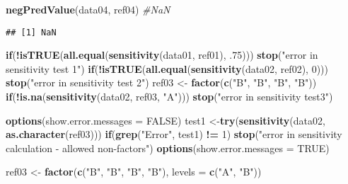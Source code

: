 \documentclass[]{article}
\newenvironment{Shaded}{\begin{snugshade}}{\end{snugshade}}
\newcommand{\CommentTok}[1]{\textcolor[rgb]{0.56,0.35,0.01}{\textit{#1}}}
\newcommand{\ControlFlowTok}[1]{\textcolor[rgb]{0.13,0.29,0.53}{\textbf{#1}}}
\newcommand{\DataTypeTok}[1]{\textcolor[rgb]{0.13,0.29,0.53}{#1}}
\newcommand{\DecValTok}[1]{\textcolor[rgb]{0.00,0.00,0.81}{#1}}
\newcommand{\FloatTok}[1]{\textcolor[rgb]{0.00,0.00,0.81}{#1}}
\newcommand{\KeywordTok}[1]{\textcolor[rgb]{0.13,0.29,0.53}{\textbf{#1}}}
\newcommand{\NormalTok}[1]{#1}
\newcommand{\OperatorTok}[1]{\textcolor[rgb]{0.81,0.36,0.00}{\textbf{#1}}}
\newcommand{\OtherTok}[1]{\textcolor[rgb]{0.56,0.35,0.01}{#1}}
\newcommand{\StringTok}[1]{\textcolor[rgb]{0.31,0.60,0.02}{#1}}
\begin{document}
\begin{Shaded}
\begin{Highlighting}[]
\KeywordTok{negPredValue}\NormalTok{(data04, ref04) }\CommentTok{#NaN}
\end{Highlighting}
\end{Shaded}

\begin{verbatim}
## [1] NaN
\end{verbatim}

\begin{Shaded}
\begin{Highlighting}[]
\ControlFlowTok{if}\NormalTok{(}\OperatorTok{!}\KeywordTok{isTRUE}\NormalTok{(}\KeywordTok{all.equal}\NormalTok{(}\KeywordTok{sensitivity}\NormalTok{(data01, ref01), }\FloatTok{.75}\NormalTok{))) }\KeywordTok{stop}\NormalTok{(}\StringTok{"error in sensitivity test 1"}\NormalTok{)}
\ControlFlowTok{if}\NormalTok{(}\OperatorTok{!}\KeywordTok{isTRUE}\NormalTok{(}\KeywordTok{all.equal}\NormalTok{(}\KeywordTok{sensitivity}\NormalTok{(data02, ref02), }\DecValTok{0}\NormalTok{))) }\KeywordTok{stop}\NormalTok{(}\StringTok{"error in sensitivity test 2"}\NormalTok{)}
\NormalTok{ref03 <-}\StringTok{ }\KeywordTok{factor}\NormalTok{(}\KeywordTok{c}\NormalTok{(}\StringTok{"B"}\NormalTok{, }\StringTok{"B"}\NormalTok{, }\StringTok{"B"}\NormalTok{, }\StringTok{"B"}\NormalTok{))}
\ControlFlowTok{if}\NormalTok{(}\OperatorTok{!}\KeywordTok{is.na}\NormalTok{(}\KeywordTok{sensitivity}\NormalTok{(data02, ref03, }\StringTok{"A"}\NormalTok{))) }\KeywordTok{stop}\NormalTok{(}\StringTok{"error in sensitivity test3"}\NormalTok{)}
      
   \KeywordTok{options}\NormalTok{(}\DataTypeTok{show.error.messages =} \OtherTok{FALSE}\NormalTok{)}
\NormalTok{   test1 <-}\KeywordTok{try}\NormalTok{(}\KeywordTok{sensitivity}\NormalTok{(data02, }\KeywordTok{as.character}\NormalTok{(ref03)))}
   \ControlFlowTok{if}\NormalTok{(}\KeywordTok{grep}\NormalTok{(}\StringTok{"Error"}\NormalTok{, test1) }\OperatorTok{!=}\StringTok{ }\DecValTok{1}\NormalTok{)}
      \KeywordTok{stop}\NormalTok{(}\StringTok{"error in sensitivity calculation - allowed non-factors"}\NormalTok{)}
   \KeywordTok{options}\NormalTok{(}\DataTypeTok{show.error.messages =} \OtherTok{TRUE}\NormalTok{)}
   
\NormalTok{   ref03 <-}\StringTok{ }\KeywordTok{factor}\NormalTok{(}\KeywordTok{c}\NormalTok{(}\StringTok{"B"}\NormalTok{, }\StringTok{"B"}\NormalTok{, }\StringTok{"B"}\NormalTok{, }\StringTok{"B"}\NormalTok{), }\DataTypeTok{levels =} \KeywordTok{c}\NormalTok{(}\StringTok{"A"}\NormalTok{, }\StringTok{"B"}\NormalTok{))}
   

\end{Highlighting}
\end{Shaded}
\end{document}
